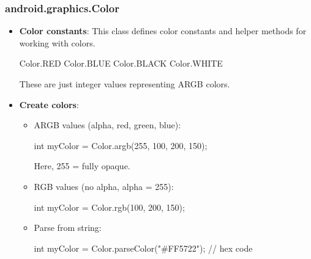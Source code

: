 \documentclass{report}
\begin{document}
    \pagebreak 
    \subsubsection{android.graphics.Color}
    \begin{itemize}
        \item \textbf{Color constants}: This class defines color constants and helper methods for working with colors.
            \bigbreak \noindent 
            \begin{javacode}
            Color.RED
            Color.BLUE
            Color.BLACK
            Color.WHITE
            \end{javacode}
            \bigbreak \noindent 
            These are just integer values representing ARGB colors.
        \item \textbf{Create colors}:
            \begin{itemize}
                \item ARGB values (alpha, red, green, blue):
                \bigbreak \noindent 
                \begin{javacode}
                int myColor = Color.argb(255, 100, 200, 150);
                \end{javacode}
                \bigbreak \noindent 
                Here, 255 = fully opaque.
            \item RGB values (no alpha, alpha = 255):
                \bigbreak \noindent 
                \begin{javacode}
                int myColor = Color.rgb(100, 200, 150);
                \end{javacode}
            \item Parse from string:
                \bigbreak \noindent 
                \begin{javacode}
                int myColor = Color.parseColor("#FF5722");  // hex code
                \end{javacode}
            \end{itemize}

    \end{itemize}



    \pagebreak 
\end{document}
